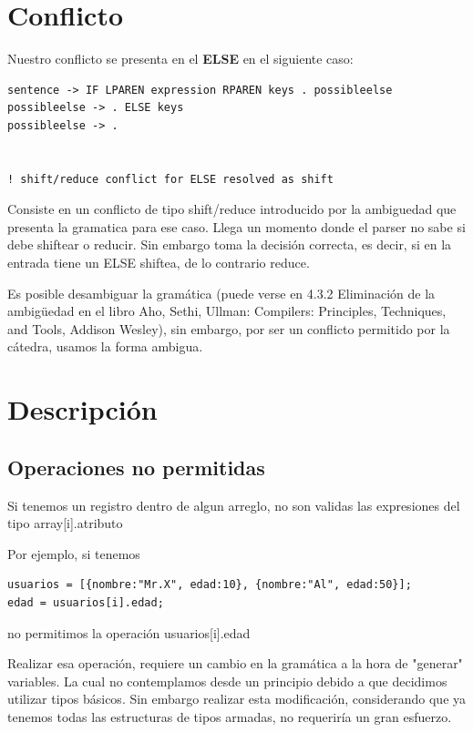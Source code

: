 \documentclass[10pt,a4paper]{article}
\begin{document}
\section{Conflicto}
Nuestro conflicto se presenta en el \textbf{ELSE} en el siguiente caso:

\begin{verbatim}
sentence -> IF LPAREN expression RPAREN keys . possibleelse
possibleelse -> . ELSE keys
possibleelse -> .


! shift/reduce conflict for ELSE resolved as shift

\end{verbatim}


Consiste en un conflicto de tipo shift/reduce introducido por la ambiguedad que presenta la gramatica para ese caso.
Llega un momento donde el parser no sabe si debe shiftear o reducir. Sin embargo toma la decisión correcta, es decir, si en la entrada tiene un ELSE shiftea, de lo contrario reduce.

Es posible desambiguar la gramática (puede verse en 4.3.2 Eliminación de la ambigüedad en el libro Aho, Sethi, Ullman: Compilers: Principles, Techniques, and Tools, Addison Wesley), sin embargo, por ser un conflicto permitido por la cátedra, usamos la forma ambigua.

\section{Descripción}

\subsection{Operaciones no permitidas}


Si tenemos un registro dentro de algun arreglo, no son validas las expresiones del tipo
array[i].atributo

Por ejemplo, si tenemos

\begin{verbatim}
usuarios = [{nombre:"Mr.X", edad:10}, {nombre:"Al", edad:50}];
edad = usuarios[i].edad;
\end{verbatim}

no permitimos la operación usuarios[i].edad

Realizar esa operación, requiere un cambio en la gramática a la hora de "generar" variables. La cual no contemplamos desde un principio debido a que decidimos utilizar tipos básicos.
Sin embargo realizar esta modificación, considerando que ya tenemos todas las estructuras de tipos armadas, no requeriría un gran esfuerzo.
\end{document}
